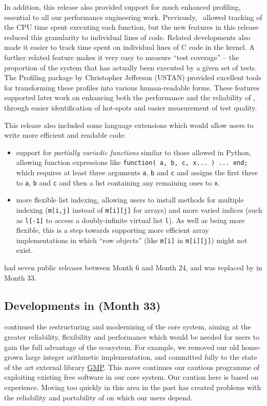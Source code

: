 In addition, this release also provided support for much enhanced
profiling, essential to all our performance engineering work.
Previously, \GAP\ allowed tracking of the CPU time spent
executing each function, but the new features in this release
reduced this granularity to individual lines of \GAP
code. Related developments also made it easier to track time spent on
individual lines of C code in the \GAP kernel. A further related
feature makes it very easy to measure ``test coverage'' -- the
proportion of the system that has actually been executed by a given
set of tests. The {\sf Profiling} package \cite{profiling} by Christopher Jefferson
(USTAN) provided excellent tools for transforming these profiles into
various human-readable forms. These features supported later work on
enhancing both the performance and the reliability of \GAP, through
easier identification of hot-spots and easier measurement of test
quality.

This release also included some language extensions which would allow
users to write more efficient and readable code:

\begin{itemize}
  \item support for \emph{partially
  variadic functions} similar to those allowed in Python, allowing
function expressions like
\verb|function( a, b, c, x... ) ... end;|
which requires at least three arguments \verb|a|, \verb|b| and
\verb|c| and assigns the first three to \verb|a|, \verb|b| and \verb|c|
and then a list containing any remaining ones to \verb|x|.
\item more flexible list indexing, allowing users to install methods
  for multiple indexing (\verb|m[i,j]| instead of \verb|m[i][j]| for
  arrays) and more varied indices (such as \verb|l[-1]| to access a
  doubly-infinite virtual list \verb|l|). As well as being more
  flexible, this is a step towards supporting more efficient array
  implementations in which ``row objects'' (like \verb|m[i]| in
  \verb|m[i][j]|) might not exist.
\end{itemize}

 had seven public releases between Month 6 and Month 24, and
was replaced by  in Month 33.

\subsection{Developments in  (Month 33)}\label{gap-4.9}

 continued the restructuring and modernizing of the core \GAP
system, aiming at the greater reliability, flexibility and performance
which would be needed for \GAP users to gain the full advantage of the \ODK ecosystem.
For example, we removed our old home-grown large integer arithmetic
implementation, and committed fully to the state of the art external
library \href{???}{GMP}. This
move continues our cautious programme of exploiting existing free
software in our core system. Our caution here is based on
experience. Moving too quickly in this area in the past has created
problems with the reliability and
portability of \GAP on which our users depend.

